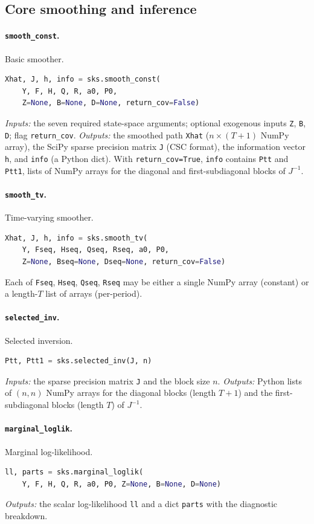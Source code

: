 \documentclass[11pt]{article}
\begin{document}
\subsection{Core smoothing and inference}

\paragraph{\texttt{smooth\_const}.}  Basic smoother.
\begin{lstlisting}[language=Python]
Xhat, J, h, info = sks.smooth_const(
    Y, F, H, Q, R, a0, P0,
    Z=None, B=None, D=None, return_cov=False)
\end{lstlisting}
\emph{Inputs:} the seven required state-space arguments; optional
exogenous inputs \texttt{Z}, \texttt{B}, \texttt{D}; flag
\texttt{return\_cov}.  \emph{Outputs:} the smoothed path
\texttt{Xhat} ($n\times(T+1)$ NumPy array), the SciPy sparse
precision matrix \texttt{J} (CSC format), the information vector
\texttt{h}, and \texttt{info} (a Python dict).  With
\texttt{return\_cov=True}, \texttt{info} contains
\texttt{Ptt} and \texttt{Ptt1}, lists of NumPy arrays for the
diagonal and first-subdiagonal blocks of $J^{-1}$.

\paragraph{\texttt{smooth\_tv}.}  Time-varying smoother.
\begin{lstlisting}[language=Python]
Xhat, J, h, info = sks.smooth_tv(
    Y, Fseq, Hseq, Qseq, Rseq, a0, P0,
    Z=None, Bseq=None, Dseq=None, return_cov=False)
\end{lstlisting}
Each of \texttt{Fseq}, \texttt{Hseq}, \texttt{Qseq}, \texttt{Rseq}
may be either a single NumPy array (constant) or a length-$T$ list
of arrays (per-period).

\paragraph{\texttt{selected\_inv}.}  Selected inversion.
\begin{lstlisting}[language=Python]
Ptt, Ptt1 = sks.selected_inv(J, n)
\end{lstlisting}
\emph{Inputs:} the sparse precision matrix \texttt{J} and the block
size $n$.  \emph{Outputs:} Python lists of $(n,n)$ NumPy arrays for
the diagonal blocks (length $T+1$) and the first-subdiagonal blocks
(length $T$) of $J^{-1}$.

\paragraph{\texttt{marginal\_loglik}.}  Marginal log-likelihood.
\begin{lstlisting}[language=Python]
ll, parts = sks.marginal_loglik(
    Y, F, H, Q, R, a0, P0, Z=None, B=None, D=None)
\end{lstlisting}
\emph{Outputs:} the scalar log-likelihood \texttt{ll} and a dict
\texttt{parts} with the diagnostic breakdown.
\end{document}
